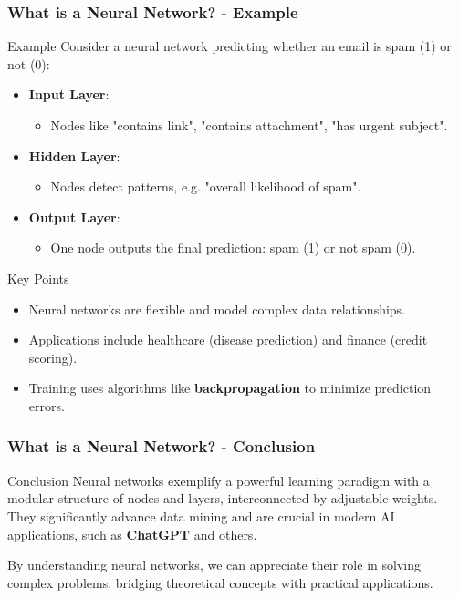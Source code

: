\documentclass[aspectratio=169]{beamer}
\begin{document}
\begin{frame}[fragile]
    \frametitle{What is a Neural Network? - Example}
    \begin{block}{Example}
        Consider a neural network predicting whether an email is spam (1) or not (0):
        \begin{itemize}
            \item \textbf{Input Layer}: 
            \begin{itemize}
                \item Nodes like "contains link", "contains attachment", "has urgent subject".
            \end{itemize}
            \item \textbf{Hidden Layer}: 
            \begin{itemize}
                \item Nodes detect patterns, e.g. "overall likelihood of spam".
            \end{itemize}
            \item \textbf{Output Layer}: 
            \begin{itemize}
                \item One node outputs the final prediction: spam (1) or not spam (0).
            \end{itemize}
        \end{itemize}
    \end{block}
    
    \begin{block}{Key Points}
        \begin{itemize}
            \item Neural networks are flexible and model complex data relationships.
            \item Applications include healthcare (disease prediction) and finance (credit scoring).
            \item Training uses algorithms like \textbf{backpropagation} to minimize prediction errors.
        \end{itemize}
    \end{block}
\end{frame}

\begin{frame}[fragile]
    \frametitle{What is a Neural Network? - Conclusion}
    \begin{block}{Conclusion}
        Neural networks exemplify a powerful learning paradigm with a modular structure of nodes and layers, interconnected by adjustable weights. 
        They significantly advance data mining and are crucial in modern AI applications, such as \textbf{ChatGPT} and others.
    \end{block}
    
    By understanding neural networks, we can appreciate their role in solving complex problems, bridging theoretical concepts with practical applications.
\end{frame}
\end{document}
